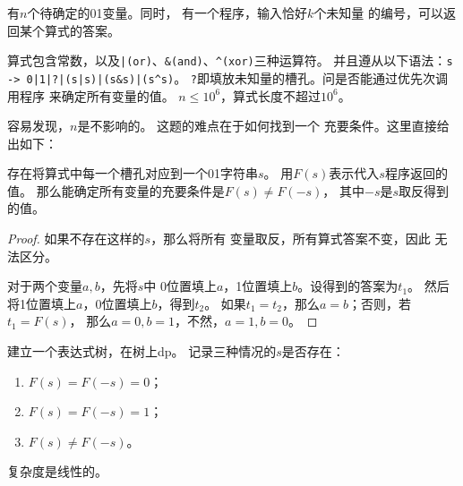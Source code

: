 \begin{prob}
	有$n$个待确定的01变量。同时，
	有一个程序，输入恰好$k$个未知量
	的编号，可以返回某个算式的答案。
	\par 算式包含常数，以及\verb#|(or)#、\verb#&(and)#、\verb#^(xor)#三种运算符。
	并且遵从以下语法：\verb#s -> 0|1|?|(s|s)|(s&s)|(s^s)#。
	\texttt{?}即填放未知量的槽孔。问是否能通过优先次调用程序
	来确定所有变量的值。
	$n \le 10^6$，算式长度不超过$10^6$。
\end{prob}

\begin{sol}
	容易发现，$n$是不影响的。
	这题的难点在于如何找到一个
	充要条件。这里直接给出如下：
	\begin{theorem}[充要条件]
		存在将算式中每一个槽孔对应到一个01字符串$s$。
		用$F(s)$表示代入$s$程序返回的值。
		那么能确定所有变量的充要条件是$F(s) \not = F(-s)$，
		其中$-s$是$s$取反得到的值。
	\end{theorem}
	\begin{proof}
		如果不存在这样的$s$，那么将所有
		变量取反，所有算式答案不变，因此
		无法区分。\par
		对于两个变量$a,b$，先将$s$中
		0位置填上$a$，1位置填上$b$。设得到的答案为$t_1$。
		然后将1位置填上$a$，0位置填上$b$，得到$t_2$。
		如果$t_1 = t_2$，那么$a=b$；否则，若$t_1=F(s)$，
		那么$a=0,b=1$，不然，$a=1,b=0$。
	\end{proof}
	\par 建立一个表达式树，在树上dp。
	记录三种情况的$s$是否存在：
	\begin{enumerate}
		\item $F(s)=F(-s)=0$；
		\item $F(s)=F(-s)=1$；
		\item $F(s) \not = F(-s)$。
	\end{enumerate}
	复杂度是线性的。
\end{sol}
